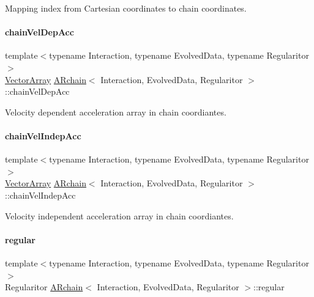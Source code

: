 Mapping index from Cartesian coordinates to chain coordinates. 

\mbox{\label{class_a_rchain_a64087e0cb9cdb6b118b4a6e416d9f012}} 
\paragraph{\texorpdfstring{chain\+Vel\+Dep\+Acc}{chainVelDepAcc}}
{\footnotesize\ttfamily template$<$typename Interaction, typename Evolved\+Data, typename Regularitor$>$ \\
\mbox{\hyperlink{class_a_rchain_a019fbadb9f4e5892736d9127537338bb}{Vector\+Array}} \mbox{\hyperlink{class_a_rchain}{A\+Rchain}}$<$ Interaction, Evolved\+Data, Regularitor $>$\+::chain\+Vel\+Dep\+Acc\hspace{0.3cm}{\ttfamily [private]}}



Velocity dependent acceleration array in chain coordiantes. 

\mbox{\label{class_a_rchain_a80d060a3341913f94c4bbbf2e2321b1d}} 
\paragraph{\texorpdfstring{chain\+Vel\+Indep\+Acc}{chainVelIndepAcc}}
{\footnotesize\ttfamily template$<$typename Interaction, typename Evolved\+Data, typename Regularitor$>$ \\
\mbox{\hyperlink{class_a_rchain_a019fbadb9f4e5892736d9127537338bb}{Vector\+Array}} \mbox{\hyperlink{class_a_rchain}{A\+Rchain}}$<$ Interaction, Evolved\+Data, Regularitor $>$\+::chain\+Vel\+Indep\+Acc\hspace{0.3cm}{\ttfamily [private]}}



Velocity independent acceleration array in chain coordiantes. 

\mbox{\label{class_a_rchain_a4dd20aa56d6a6403260ad3ced2987eb0}} 
\paragraph{\texorpdfstring{regular}{regular}}
{\footnotesize\ttfamily template$<$typename Interaction, typename Evolved\+Data, typename Regularitor$>$ \\
Regularitor \mbox{\hyperlink{class_a_rchain}{A\+Rchain}}$<$ Interaction, Evolved\+Data, Regularitor $>$\+::regular\hspace{0.3cm}{\ttfamily [private]}}



